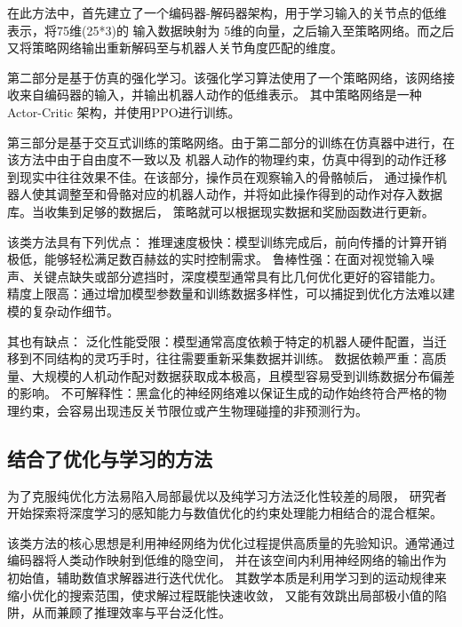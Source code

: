 在此方法中，首先建立了一个编码器-解码器架构，用于学习输入的关节点的低维表示，将75维(25*3)的
输入数据映射为 5维的向量，之后输入至策略网络。而之后又将策略网络输出重新解码至与机器人关节角度匹配的维度。

第二部分是基于仿真的强化学习。该强化学习算法使用了一个策略网络，该网络接收来自编码器的输入，并输出机器人动作的低维表示。
其中策略网络是一种Actor-Critic 架构，并使用PPO进行训练。

第三部分是基于交互式训练的策略网络。由于第二部分的训练在仿真器中进行，在该方法中由于自由度不一致以及
机器人动作的物理约束，仿真中得到的动作迁移到现实中往往效果不佳。在该部分，操作员在观察输入的骨骼帧后，
通过操作机器人使其调整至和骨骼对应的机器人动作，并将如此操作得到的动作对存入数据库。当收集到足够的数据后，
策略就可以根据现实数据和奖励函数进行更新。

该类方法具有下列优点：
推理速度极快：模型训练完成后，前向传播的计算开销极低，能够轻松满足数百赫兹的实时控制需求。
鲁棒性强：在面对视觉输入噪声、关键点缺失或部分遮挡时，深度模型通常具有比几何优化更好的容错能力。
精度上限高：通过增加模型参数量和训练数据多样性，可以捕捉到优化方法难以建模的复杂动作细节。

其也有缺点：
泛化性能受限：模型通常高度依赖于特定的机器人硬件配置，当迁移到不同结构的灵巧手时，往往需要重新采集数据并训练。
数据依赖严重：高质量、大规模的人机动作配对数据获取成本极高，且模型容易受到训练数据分布偏差的影响。
不可解释性：黑盒化的神经网络难以保证生成的动作始终符合严格的物理约束，会容易出现违反关节限位或产生物理碰撞的非预测行为。

\subsection{结合了优化与学习的方法}
为了克服纯优化方法易陷入局部最优以及纯学习方法泛化性较差的局限，
研究者开始探索将深度学习的感知能力与数值优化的约束处理能力相结合的混合框架。

该类方法的核心思想是利用神经网络为优化过程提供高质量的先验知识。通常通过编码器将人类动作映射到低维的隐空间，
并在该空间内利用神经网络的输出作为初始值，辅助数值求解器进行迭代优化。
其数学本质是利用学习到的运动规律来缩小优化的搜索范围，使求解过程既能快速收敛，
又能有效跳出局部极小值的陷阱，从而兼顾了推理效率与平台泛化性\cite{zhangHRGCN2D3DWholebody2025}\cite{dingBunnyvisionproRealtimeBimanual2025}\cite{zhang_kinematic_2022}。
